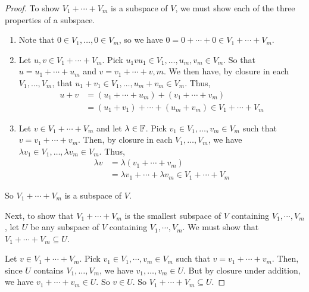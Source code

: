 \begin{proof}
    To show $V_1 + \cdots + V_m$ is a subspace of $V$, we must show each of the three properties of a subspace.  
    \begin{enumerate}
        \item Note that $0 \in V_1, \dots, 0\in V_m$, so we have $0 = 0 + \cdots + 0 \in V_1 + \cdots + V_m$. 
        \item Let $u,v\in V_1 + \cdots + V_m$. Pick $u_1vu_1 \in V_1, \dots, u_m, v_m\in V_m$. So that $u = u_1 + \cdots + u_m$ and $v = v_1 + \cdots + v,m$.  We then have, by closure in each $V_1, \dots, V_m$, that $u_1 + v_1 \in V_1, \dots, u_m+v_m \in V_m$. Thus, 
        \begin{align*}
            u +v &= (u_1 + \cdots +u_m) + (v_1 + \cdots + v_m) \\
            &= (u_1 + v_1) + \cdots + (u_m + v_m) \in V_1 + \cdots + V_m
        \end{align*}
        \item Let $v\in V_1 + \cdots + V_m$ and let $\lambda\in \mathbb F$. Pick $v_1\in V_1, \dots, v_m\in V_m$ such that $v = v_1 + \cdots + v_m$. Then, by closure in each $V_1, \dots, V_m$, we have $\lambda v_1 \in V_1, \dots, \lambda v_m \in V_m$. Thus,
        \begin{align*}
            \lambda v &= \lambda(v_1 + \cdots + v_m) \\
            &= \lambda v_1 + \cdots + \lambda v_m \in V_1 + \cdots + V_m
        \end{align*}
    \end{enumerate}
    So $V_1 + \cdots + V_m$ is a subspace of $V$. 
    
    Next, to show that $V_1 + \cdots + V_m$ is the smallest subspace of $V$ containing $V_1, \cdots, V_m$, let $U$ be any subspace of $V$ containing $V_1, \cdots, V_m$. We must show that $V_1 + \cdots + V_m \subseteq U$. 

    Let $v\in V_1 + \cdots + V_m$. Pick $v_1 \in V_1, \cdots, v_m\in V_m$ such that $v = v_1 + \cdots + v_m$. Then, since $U$ contains $V_1, \dots, V_m$, we have $v_1, \dots, v_m \in U$. But by closure under addition, we have $v_1 + \cdots + v_m \in U$. So $v\in U$. So $V_1 + \cdots + V_m \subseteq U$.
\end{proof}
